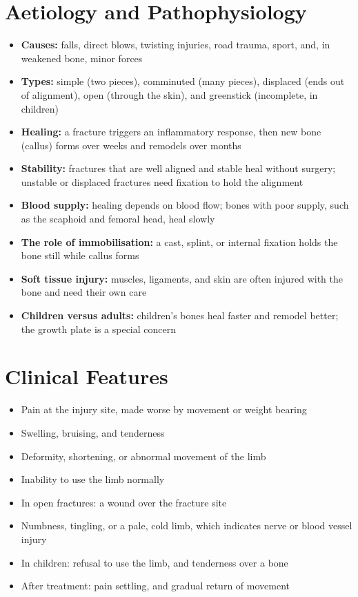 \section*{Aetiology and Pathophysiology}
\begin{itemize}
    \item \textbf{Causes:} falls, direct blows, twisting injuries, road trauma, sport, and, in weakened bone, minor forces
    \item \textbf{Types:} simple (two pieces), comminuted (many pieces), displaced (ends out of alignment), open (through the skin), and greenstick (incomplete, in children)
    \item \textbf{Healing:} a fracture triggers an inflammatory response, then new bone (callus) forms over weeks and remodels over months
    \item \textbf{Stability:} fractures that are well aligned and stable heal without surgery; unstable or displaced fractures need fixation to hold the alignment
    \item \textbf{Blood supply:} healing depends on blood flow; bones with poor supply, such as the scaphoid and femoral head, heal slowly
    \item \textbf{The role of immobilisation:} a cast, splint, or internal fixation holds the bone still while callus forms
    \item \textbf{Soft tissue injury:} muscles, ligaments, and skin are often injured with the bone and need their own care
    \item \textbf{Children versus adults:} children's bones heal faster and remodel better; the growth plate is a special concern
\end{itemize}

\section*{Clinical Features}
\begin{itemize}
    \item Pain at the injury site, made worse by movement or weight bearing
    \item Swelling, bruising, and tenderness
    \item Deformity, shortening, or abnormal movement of the limb
    \item Inability to use the limb normally
    \item In open fractures: a wound over the fracture site
    \item Numbness, tingling, or a pale, cold limb, which indicates nerve or blood vessel injury
    \item In children: refusal to use the limb, and tenderness over a bone
    \item After treatment: pain settling, and gradual return of movement
\end{itemize}

